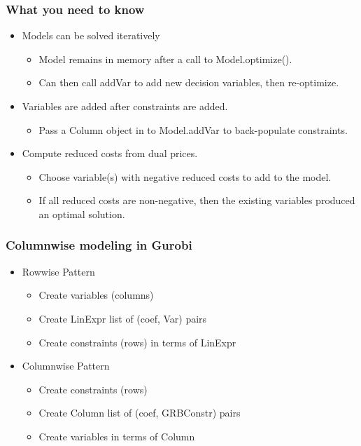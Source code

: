 \documentclass[12pt,handout]{beamer}
\begin{document}
\begin{frame}
\frametitle {What you need to know}
\begin{itemize}
\item Models can be solved iteratively
	\begin{itemize}
	\item Model remains in memory after a call to Model.optimize().
	\item Can then call addVar to add new decision variables, then re-optimize.
	\end{itemize}
\item Variables are added after constraints are added.
     \begin{itemize}
     \item Pass a Column object in to Model.addVar to back-populate constraints.
     \end{itemize}
\item Compute reduced costs from dual prices.
     \begin{itemize}
     \item Choose variable(s) with negative reduced costs to add to the model.
     \item If all reduced costs are non-negative, then the existing variables produced an optimal solution.
     \end{itemize}
\end{itemize}
\end{frame}

\begin{frame}
\frametitle {Columnwise modeling in Gurobi}
\begin{itemize}
  \item Rowwise Pattern
  \begin{itemize}
    \item Create variables (columns)
    \item Create LinExpr list of (coef, Var) pairs
    \item Create constraints (rows) in terms of LinExpr
  \end{itemize}
  \item Columnwise Pattern
  \begin{itemize}
    \item Create constraints (rows)
    \item Create Column list of (coef, GRBConstr) pairs
    \item Create variables in terms of Column
  \end{itemize}
\end{itemize}
\end{frame}
\end{document}
